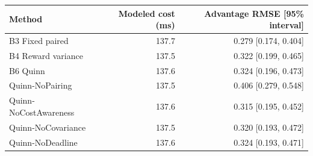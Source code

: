 \begin{tabular}{lrr}
\hline
Method & Modeled cost (ms) & Advantage RMSE [95\% interval] \\
\hline
B3 Fixed paired & 137.7 & 0.279 [0.174, 0.404] \\
B4 Reward variance & 137.5 & 0.322 [0.199, 0.465] \\
B6 Quinn & 137.6 & 0.324 [0.196, 0.473] \\
Quinn-NoPairing & 137.5 & 0.406 [0.279, 0.548] \\
Quinn-NoCostAwareness & 137.6 & 0.315 [0.195, 0.452] \\
Quinn-NoCovariance & 137.5 & 0.320 [0.193, 0.472] \\
Quinn-NoDeadline & 137.6 & 0.324 [0.193, 0.471] \\
\hline
\end{tabular}
